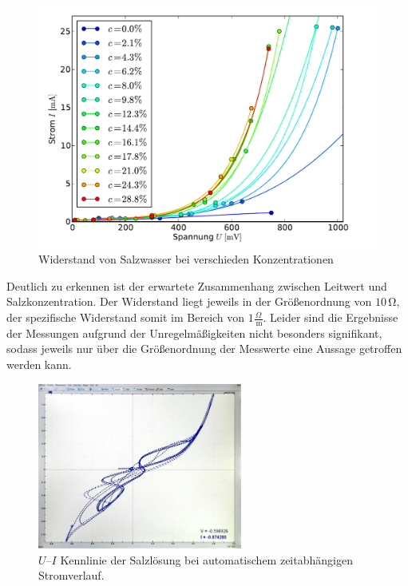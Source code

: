 \documentclass[11pt]{scrartcl}
\newcommand{\unit}[1]{\ensuremath{\,\mathrm{#1}}} %
\begin{document}
\begin{figure}[ht]
\begin{center}
\includegraphics[width=1.0\textwidth]{images/kennlinien_lin.pdf}
\end{center}
\vspace{-1.5\baselineskip}
\caption{Widerstand von Salzwasser bei verschieden Konzentrationen}
\label{widerstand_vormessung}
\end{figure}

Deutlich zu erkennen ist der erwartete Zusammenhang zwischen Leitwert und Salzkonzentration. Der Widerstand liegt jeweils in der Größenordnung von $10\unit{\Omega}$, der spezifische Widerstand somit im Bereich von $1 \frac{\Omega}{\unit{m}}$. Leider sind die Ergebnisse der Messungen aufgrund der Unregelmäßigkeiten nicht besonders signifikant, sodass jeweils nur über die Größenordnung der Messwerte eine Aussage getroffen werden kann.

\begin{figure}[ht]
\begin{center}
\includegraphics[width=0.6\textwidth]{images/kennlinie_screen.jpg}
\end{center}
\vspace{-1.5\baselineskip}
\caption{$U$--$I$ Kennlinie der Salzlösung bei automatischem zeitabhängigen Stromverlauf.}
\label{kennlinie-screen}
\end{figure}
\end{document}
